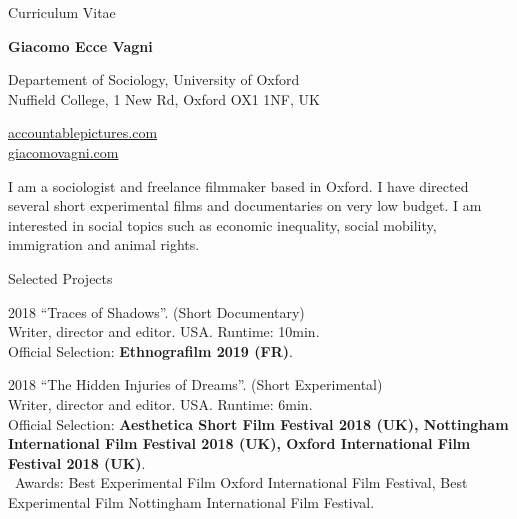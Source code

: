 \documentclass[12pt,a4paper]{article}
\begin{document}
\begin{cv}{Curriculum Vitae}
  \begin{cvlist}{}
  \item \colorbox{mygray} { \textbf{Giacomo Ecce Vagni}  }

	\item  Departement of Sociology, University of Oxford  \\ Nuffield College, 1 New Rd, Oxford OX1 1NF, UK

      \item 
      \href{http://accountablepictures.com} {accountablepictures.com} \\ 
     \href{https://giacomovagni.com} {giacomovagni.com} \\
    
  \end{cvlist}
  
  I am a sociologist and freelance filmmaker based in Oxford.  I have directed several short experimental films and documentaries on very low budget.
  I am interested in social topics such as economic inequality, social mobility, immigration and animal rights.
  
  \hspace{3cm}
  
   \begin{cvlist}{Selected Projects}
   	\footnotesize
   	
   	   	\item[2018] ``Traces of Shadows''. (Short Documentary)
   	   	\\ Writer, director and editor. USA. Runtime: 10min. 
   	   	\\ \colorbox{mygray}{Official Selection}: \textbf{Ethnografilm 2019 (FR)}. 
   	   	
   	\item[2018] ``The Hidden Injuries of Dreams''. (Short Experimental)
   	\\ Writer, director and editor. USA. Runtime: 6min. 
   	\\ \colorbox{mygray}{Official Selection}: \textbf{Aesthetica Short Film Festival 2018 (UK), Nottingham International Film Festival 2018 (UK), Oxford International Film Festival 2018 (UK)}. 
    \\ \colorbox{mygray}{Awards}: Best Experimental Film Oxford International Film Festival, Best Experimental Film Nottingham International Film Festival.
   	 			   	   		   	   	

\end{cvlist}
\end{cv}
\end{document}
